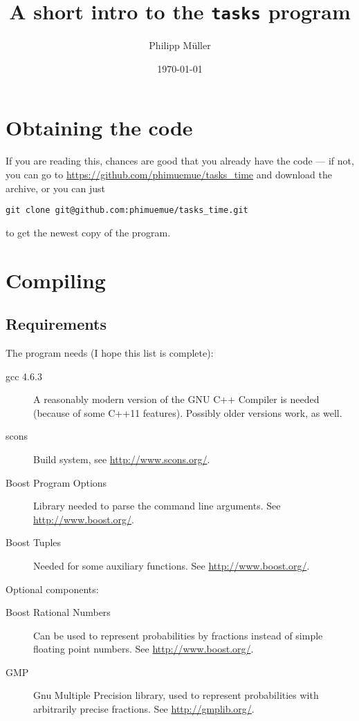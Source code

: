 \documentclass[usletter]{article}
\title{A short intro to the \texttt{tasks} program}
\date{\today}
\author{Philipp Müller}
\begin{document}
\maketitle

\section{Obtaining the code}

If you are reading this, chances are good that you already have the code --- if not, you can go to \url{https://github.com/phimuemue/tasks_time} and download the archive, or you can just
\begin{verbatim}
git clone git@github.com:phimuemue/tasks_time.git
\end{verbatim}
to get the newest copy of the program.

\section{Compiling}

\subsection{Requirements}

The program needs (I hope this list is complete):
\begin{description}
\item[gcc 4.6.3] A reasonably modern version of the GNU C++ Compiler is needed (because of some C++11 features). Possibly older versions work, as well.
\item[scons] Build system, see \url{http://www.scons.org/}.
\item[Boost Program Options] Library needed to parse the command line arguments. See \url{http://www.boost.org/}.
\item[Boost Tuples] Needed for some auxiliary functions. See \url{http://www.boost.org/}.
\end{description}

Optional components:
\begin{description}
\item[Boost Rational Numbers] Can be used to represent probabilities by fractions instead of simple floating point numbers. See \url{http://www.boost.org/}.
\item[GMP] Gnu Multiple Precision library, used to represent probabilities with arbitrarily precise fractions. See \url{http://gmplib.org/}.
\end{description}
\end{document}
